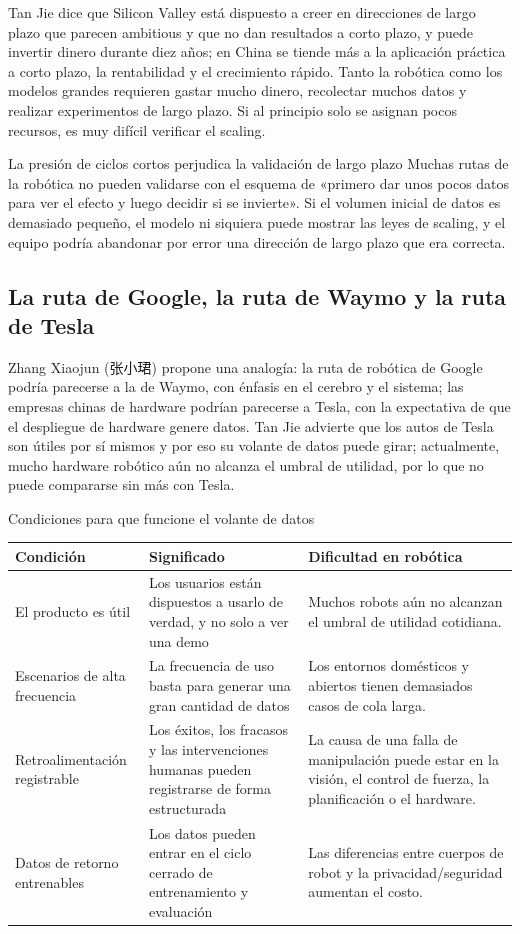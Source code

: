 Tan Jie dice que Silicon Valley está dispuesto a creer en direcciones de largo plazo que parecen ambitious y que no dan resultados a corto plazo, y puede invertir dinero durante diez años; en China se tiende más a la aplicación práctica a corto plazo, la rentabilidad y el crecimiento rápido. Tanto la robótica como los modelos grandes requieren gastar mucho dinero, recolectar muchos datos y realizar experimentos de largo plazo. Si al principio solo se asignan pocos recursos, es muy difícil verificar el scaling.

\begin{warningbox}{La presión de ciclos cortos perjudica la validación de largo plazo}
Muchas rutas de la robótica no pueden validarse con el esquema de «primero dar unos pocos datos para ver el efecto y luego decidir si se invierte». Si el volumen inicial de datos es demasiado pequeño, el modelo ni siquiera puede mostrar las leyes de scaling, y el equipo podría abandonar por error una dirección de largo plazo que era correcta.
\end{warningbox}

\subsection{La ruta de Google, la ruta de Waymo y la ruta de Tesla}

Zhang Xiaojun (张小珺) propone una analogía: la ruta de robótica de Google podría parecerse a la de Waymo, con énfasis en el cerebro y el sistema; las empresas chinas de hardware podrían parecerse a Tesla, con la expectativa de que el despliegue de hardware genere datos. Tan Jie advierte que los autos de Tesla son útiles por sí mismos y por eso su volante de datos puede girar; actualmente, mucho hardware robótico aún no alcanza el umbral de utilidad, por lo que no puede compararse sin más con Tesla.

\begin{knowledgebox}{Condiciones para que funcione el volante de datos}
\begin{tabularx}{\textwidth}{p{}p{}X}
\toprule
Condición & Significado & Dificultad en robótica \\
\midrule
El producto es útil & Los usuarios están dispuestos a usarlo de verdad, y no solo a ver una demo & Muchos robots aún no alcanzan el umbral de utilidad cotidiana. \\
Escenarios de alta frecuencia & La frecuencia de uso basta para generar una gran cantidad de datos & Los entornos domésticos y abiertos tienen demasiados casos de cola larga. \\
Retroalimentación registrable & Los éxitos, los fracasos y las intervenciones humanas pueden registrarse de forma estructurada & La causa de una falla de manipulación puede estar en la visión, el control de fuerza, la planificación o el hardware. \\
Datos de retorno entrenables & Los datos pueden entrar en el ciclo cerrado de entrenamiento y evaluación & Las diferencias entre cuerpos de robot y la privacidad/seguridad aumentan el costo. \\
\bottomrule
\end{tabularx}
\end{knowledgebox}

